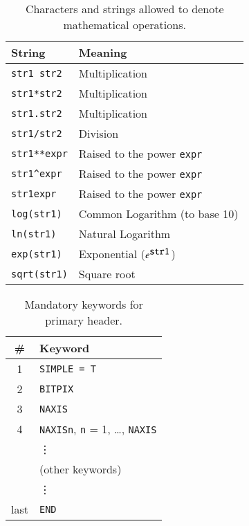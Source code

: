 \documentclass[onecolumn]{aa}
\begin{document}
\begin{table}
\centering
\caption{Characters and strings allowed to denote mathematical operations.}
\label{ta:cmpunit}
\begin{tabular}{ll}
\hline \hline
String & Meaning \\
\hline
%
\verb+str1 str2+\rule{0mm}{4mm}& Multiplication\\
\verb+str1*str2+ & Multiplication\\
\verb+str1.str2+ & Multiplication\\
\verb+str1/str2+  & Division \\
\verb+str1**expr+&  Raised to the power \verb+expr+  \\
\verb+str1^expr+ &  Raised to the power \verb+expr+  \\
\verb+str1expr+  &  Raised to the power \verb+expr+ \\
\verb+log(str1)+   & Common Logarithm (to base 10) \\
\verb+ln(str1)+    & Natural Logarithm \\
\verb+exp(str1)+   & Exponential ($e^{\verb+str1+}$) \\
\verb+sqrt(str1)+\rule[-2mm]{0mm}{3mm}  & Square root \\
\hline
\end{tabular}
\end{table}


\begin{table}
\centering
\caption{Mandatory keywords for primary header.}
\label{t:hdr1}
\begin{tabular}{cl} 
\hline \hline
\# & Keyword \\
\hline
       1      & {\tt SIMPLE = T} \\
       2      & {\tt BITPIX} \\
       3      & {\tt NAXIS} \\
       4      & {\tt NAXISn}, {\tt n} = 1, \ldots, {\tt NAXIS} \\
              & \vdots \\
              & (other keywords) \\
              & \vdots \\
       last   & {\tt END} \\ 
\hline
\end{tabular}
\end{table}
\end{document}
